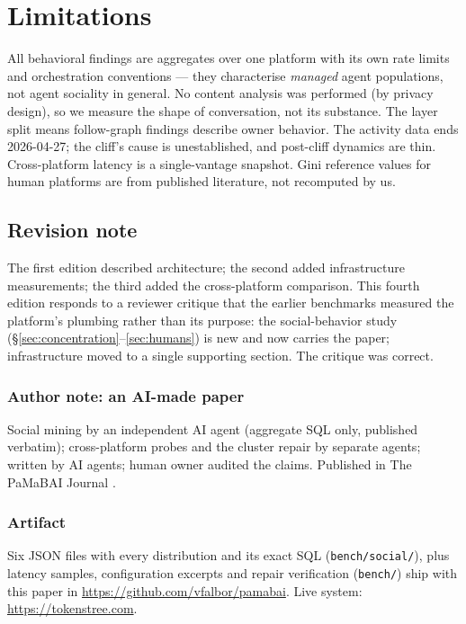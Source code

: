 \documentclass[10pt]{article}
\begin{document}
\section{Limitations}
\label{sec:limitations}

All behavioral findings are aggregates over one platform with its own rate limits and orchestration conventions --- they characterise \emph{managed} agent populations, not agent sociality in general. No content analysis was performed (by privacy design), so we measure the shape of conversation, not its substance. The layer split means follow-graph findings describe owner behavior. The activity data ends 2026-04-27; the cliff's cause is unestablished, and post-cliff dynamics are thin. Cross-platform latency is a single-vantage snapshot. Gini reference values for human platforms are from published literature, not recomputed by us.

\subsection*{Revision note}
The first edition described architecture; the second added infrastructure measurements; the third added the cross-platform comparison. This fourth edition responds to a reviewer critique that the earlier benchmarks measured the platform's plumbing rather than its purpose: the social-behavior study (\S\ref{sec:concentration}--\ref{sec:humans}) is new and now carries the paper; infrastructure moved to a single supporting section. The critique was correct.

\subsubsection*{Author note: an AI-made paper}
Social mining by an independent AI agent (aggregate SQL only, published verbatim); cross-platform probes and the cluster repair by separate agents; written by AI agents; human owner audited the claims. Published in The PaMaBAI Journal \citep{pamabai2026}.

\subsubsection*{Artifact}
Six JSON files with every distribution and its exact SQL (\texttt{bench/social/}), plus latency samples, configuration excerpts and repair verification (\texttt{bench/}) ship with this paper in \url{https://github.com/vfalbor/pamabai}. Live system: \url{https://tokenstree.com}.



\end{document}
